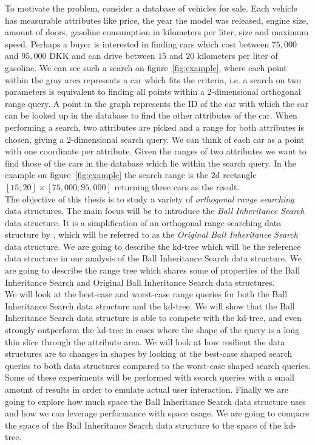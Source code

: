 \noindent To motivate the problem, consider a database of vehicles for sale. Each vehicle has measurable attributes like price, the year the model was released, engine size, amount of doors, gasoline consumption in kilometers per liter, size  and maximum speed. Perhaps a buyer is interested in finding cars which cost between $75,000$ and $95,000$ DKK and can drive between $15$ and $20$ kilometers per liter of gasoline. We can see such a search on figure~\ref{fig:example}, where each point within the gray area represents a car which fits the criteria, i.e. a search on two parameters is equivalent to finding all points within a $2$-dimensional orthogonal range query. A point in the graph represents the ID of the car with which the car can be looked up in the database to find the other attributes of the car. When performing a search, two attributes are picked and a range for both attributes is chosen, giving a $2$-dimensional search query. We can think of each car as a point with one coordinate per attribute. Given the ranges of two attributes we want to find those of the cars in the database which lie within the search query. In the example on figure~\ref{fig:example} the search range is the $2$d rectangle $[15;20] \times [75,000;95,000]$ returning three cars as the result. \\

The objective of this thesis is to study a variety of \emph{orthogonal range searching} data structures. The main focus will be to introduce the \emph{Ball Inheritance Search} data structure. It is a simplification of an orthogonal range searching data structure by \citet{chanetal}, which will be referred to as the \emph{Original Ball Inheritance Search} data structure. We are going to describe the kd-tree which will be the reference data structure in our analysis of the Ball Inheritance Search data structure. We are going to describe the range tree which shares some of properties of the Ball Inheritance Search and Original Ball Inheritance Search data structures. \\

We will look at the best-case and worst-case range queries for both the Ball Inheritance Search data structure and the kd-tree. We will show that the Ball Inheritance Search data structure is able to compete with the kd-tree, and even strongly outperform the kd-tree in cases where the shape of the query is a long thin slice through the attribute area. We will look at how resilient the data structures are to changes in shapes by looking at the best-case shaped search queries to both data structures compared to the worst-case shaped search queries. Some of these experiments will be performed with search queries with a small amount of results in order to emulate actual user interaction. Finally we are going to explore how much space the Ball Inheritance Search data structure uses and how we can leverage performance with space usage. We are going to compare the space of the Ball Inheritance Search data structure to the space of the kd-tree. \\ 


